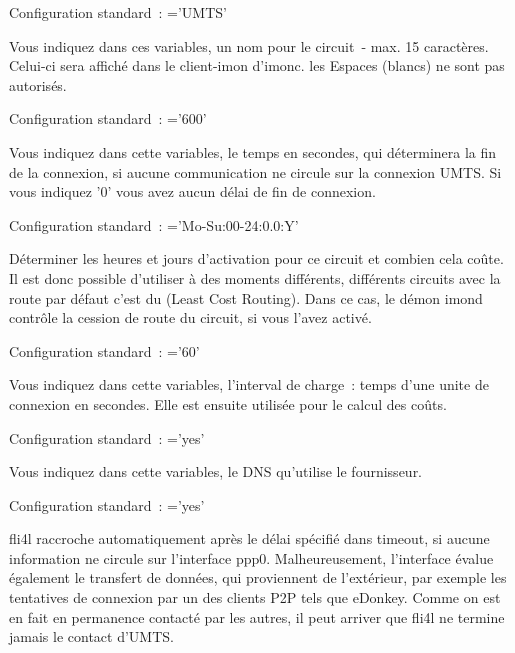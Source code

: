 \begin{description}

  Configuration standard~: ='UMTS'

  Vous indiquez dans ces variables, un nom pour le circuit~- max. 15 caractères.
  Celui-ci sera affiché dans le client-imon d'imonc. les Espaces (blancs) ne sont
  pas autorisés.


  Configuration standard~: ='600'

  Vous indiquez dans cette variables, le temps en secondes, qui déterminera la
  fin de la connexion, si aucune communication ne circule sur la connexion UMTS.
  Si vous indiquez '0' vous avez aucun délai de fin de connexion.


  Configuration standard~: ='Mo-Su:00-24:0.0:Y'

  Déterminer les heures et jours d'activation pour ce circuit et combien cela
  coûte. Il est donc possible d'utiliser à des moments différents, différents
  circuits avec la route par défaut c'est du (Least Cost Routing). Dans ce cas,
  le démon imond contrôle la cession de route du circuit, si vous l'avez activé.


  Configuration standard~: ='60'

  Vous indiquez dans cette variables, l'interval de charge~: temps d'une unite
  de connexion en secondes. Elle est ensuite utilisée pour le calcul des coûts.


  Configuration standard~: ='yes'

  Vous indiquez dans cette variables, le DNS qu'utilise le fournisseur.


  Configuration standard~: ='yes'

  fli4l raccroche automatiquement après le délai spécifié dans timeout, si aucune
  information ne circule sur l'interface ppp0. Malheureusement, l'interface
  évalue également le transfert de données, qui proviennent de l'extérieur, par
  exemple les tentatives de connexion par un des clients P2P tels que eDonkey.
  Comme on est en fait en permanence contacté par les autres, il peut arriver
  que fli4l ne termine jamais le contact d'UMTS.


\end{description}
